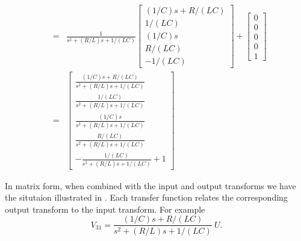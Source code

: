 \begin{slide}
\begin{eqnarray*} &=& \frac{1}{s^2 + (R/L)s
+1/(LC)}\left[\begin{array}{c}
  (1/C)s+R/(LC) \\
  1/(LC) \\
  (1/C)s \\
  R/(LC) \\
  -1/(LC)
\end{array}\right] + \left[\begin{array}{c}
  0 \\
  0 \\
  0 \\
  0 \\
  1
\end{array} \right]\\
&=& \left[\begin{array}{c}
  \frac{(1/C)s+R/(LC)}{s^2 + (R/L)s
+1/(LC)} \\
  \frac{1/(LC)}{s^2 + (R/L)s
+1/(LC)} \\
  \frac{(1/C)s}{s^2 + (R/L)s
+1/(LC)} \\
  \frac{R/(LC)}{s^2 + (R/L)s
+1/(LC)} \\
  -\frac{1/(LC)}{s^2 + (R/L)s
+1/(LC)}+1
\end{array}\right]
\end{eqnarray*}
\end{slide}

In matrix form, when combined with the input and output transforms we
have the situtaion illustrated in .
Each transfer function relates the corresponding output transform
to the input transform. For example
\[V_{31}= \frac{(1/C)s+R/(LC)}{s^2 + (R/L)s
+1/(LC)}\ U.\]

